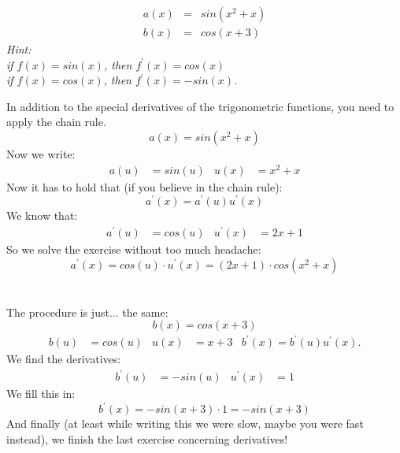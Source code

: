 \documentclass[a4paper]{report}
\begin{document}
\begin{Exercise}[title= (Optional) Find the derivatives of the following functions,difficulty=3,label=ex2]
\begin{eqnarray*}
a(x) & = & sin(x^2+x)\\
b(x) & = & cos(x+3)
\end{eqnarray*}
\textit{Hint: \\if $f(x)=sin(x)$, then $f^\prime(x)=cos(x)$ \\if $f(x)=cos(x)$, then $f^\prime(x)=-sin(x)$.}
\end{Exercise}
\begin{Answer}[ref=ex2]
\noindent In addition to the special derivatives of the trigonometric functions, you need to apply the chain rule. 
\begin{equation*}
a(x)=sin(x^2+x)
\end{equation*}
Now we write:
\begin{align*}
a(u) &= sin(u) & u(x)&=x^2+x
\end{align*}
Now it has to hold that (if you believe in the chain rule):
\begin{equation*}
a^\prime(x) = a^\prime(u) u^\prime(x)
\end{equation*}
We know that:
\begin{align*}
a^\prime(u) &= cos(u) & u^\prime(x)&=2x+1
\end{align*}
So we solve the exercise without too much headache:
\begin{equation*}
a^\prime(x)= cos(u) \cdot u^\prime(x) = (2x+1)\cdot cos(x^2+x) 
\end{equation*}\\
\\
The procedure is just... the same:
\begin{equation*}
b(x)=cos(x+3)
\end{equation*}
\begin{align*}
b(u)&=cos(u) & u(x)&=x+3 & b^\prime(x) = b^\prime(u) u^\prime(x).
\end{align*}
We find the derivatives:
\begin{align*}
b^\prime(u) &= -sin(u) & u^\prime(x) &= 1
\end{align*}
We fill this in:
\begin{equation*} 
b^\prime(x) = -sin(x+3) \cdot 1= -sin(x+3) 
 \end{equation*}
And finally (at least while writing this we were slow, maybe you were fast instead), we finish the last exercise concerning derivatives!

\end{Answer}
\end{document}
